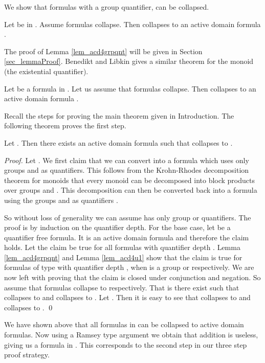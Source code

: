 \documentclass[envcountsame]{llncs}
\begin{document}
We show that formulas with a group quantifier,  can be collapsed.
\begin{lemma}
 \label{lem_acd4grpqnt}
Let  be in . Assume formulas\linebreak 
collapse. Then  collapses to an active domain formula .
\end{lemma}

The proof of Lemma \ref{lem_acd4grpqnt} will be given in Section \ref{sec_lemmaProof}. 
Benedikt and Libkin \cite{libkin_relIntrStruc} gives a similar theorem for the monoid  (the existential quantifier).
\begin{lemma}
 \label{lem_acd4u1}
Let  be a formula in . Let us assume that formulas
 collapse. Then  collapses to an active domain formula .
\end{lemma}

Recall the  steps for proving the main theorem given in Introduction. The following theorem proves the first step.

\begin{theorem}
\label{thm_acd4ls}
 Let . Then there exists an active domain formula  such that  collapses to .
\end{theorem}
\begin{proof}
Let . We first claim that we can convert  into a formula which uses only groups and  as quantifiers. 
This follows from the Krohn-Rhodes decomposition theorem for monoids that every monoid can be decomposed into block products over groups and . This decomposition can then be converted back into a formula using the groups and  as quantifiers \cite{str_cirBook}. 

So without loss of generality we can assume  has only group or  quantifiers.
The proof is by induction on the quantifier depth. For the base case, let  be a quantifier free formula. 
It is an active domain formula and therefore the claim holds. Let the claim be true for all formulas with quantifier depth . 
Lemma \ref{lem_acd4grpqnt} and Lemma \ref{lem_acd4u1} show that the claim is true for formulas of type  with 
quantifier depth , when  is a group or  respectively. We are now left with proving that the claim is closed under conjunction and negation. So assume that 
formulas  collapse to  respectively. That is there exist  such that  collapses
 to  and  collapses  to . Let . 
Then it is easy to see that  collapses  to  and  collapses  to .
\qed \end{proof}

We have shown above that all formulas in  can be collapsed to active domain formulas. Now using a Ramsey type argument we obtain that addition is useless, giving us a formula in . This corresponds to the second step in our three step proof strategy.
\end{document}
